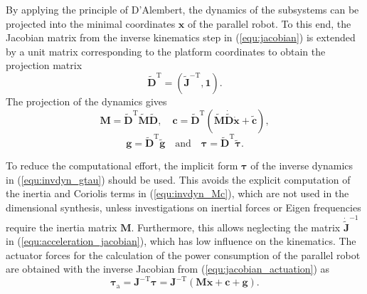 \documentclass[fleqn,a4paper,10pt]{article}
\newcommand{\bm}[1]{\mathbf{#1}}
\newcommand{\transp}[0]{{\mathrm{T}}}
\begin{document}
\begin{multicols}{2}
By applying the principle of D'Alembert, the dynamics of the subsystems can be projected into the minimal coordinates $\bm{x}$ of the parallel robot.
To this end, the Jacobian matrix from the inverse kinematics step in (\ref{equ:jacobian}) is extended by a unit matrix corresponding to the platform coordinates to obtain the projection matrix
%
\begin{equation}
\tilde{\bm{D}}^\transp=\left(\tilde{\bm{J}}^{-\transp},\bm{1}\right)
.
\label{equ:dyn_projection_matrix}
\end{equation}
%
The projection of the dynamics %
 gives
%
\begin{equation}
\bm{M}=\tilde{\bm{D}}^\transp\tilde{\bm{M}}\tilde{\bm{D}}, \quad
\bm{c}=\tilde{\bm{D}}^\transp (\tilde{\bm{M}}\dot{\tilde{\bm{D}}}\dot{\bm{x}}+\tilde{\bm{c}}),
\label{equ:invdyn_Mc}
\end{equation}
%
\begin{equation}
\bm{g}=\tilde{\bm{D}}^\transp\tilde{\bm{g}} \quad \mathrm{and} \quad 
\bm{\tau}=\tilde{\bm{D}}^\transp\tilde{\bm{\tau}}.
\label{equ:invdyn_gtau}
\end{equation}

%
To reduce the computational effort, the implicit form $\bm{\tau}$ of the inverse dynamics in (\ref{equ:invdyn_gtau}) should be used.
This avoids the explicit computation of the inertia and Coriolis terms in (\ref{equ:invdyn_Mc}), which are not used in the dimensional synthesis, unless investigations on inertial forces \cite{FrindtKreHes2010} or Eigen frequencies \cite{JamwalHusXie2015} require the inertia matrix $\bm{M}$.
Furthermore, this allows neglecting the matrix $\dot{\tilde{\bm{J}}}^{-1}$ in (\ref{equ:acceleration_jacobian}), which has low influence on the kinematics.
The actuator forces for the calculation of the power consumption of the parallel robot are obtained with the inverse Jacobian from (\ref{equ:jacobian_actuation}) as
%
\begin{equation}
\bm{\tau}_\mathrm{a}
=\bm{J}^{-\transp} \bm{\tau}
=\bm{J}^{-\transp} (\bm{M}\ddot{\bm{x}}+\bm{c}+\bm{g}).
\label{equ:actforce}
\end{equation}


\end{multicols}
\end{document}
